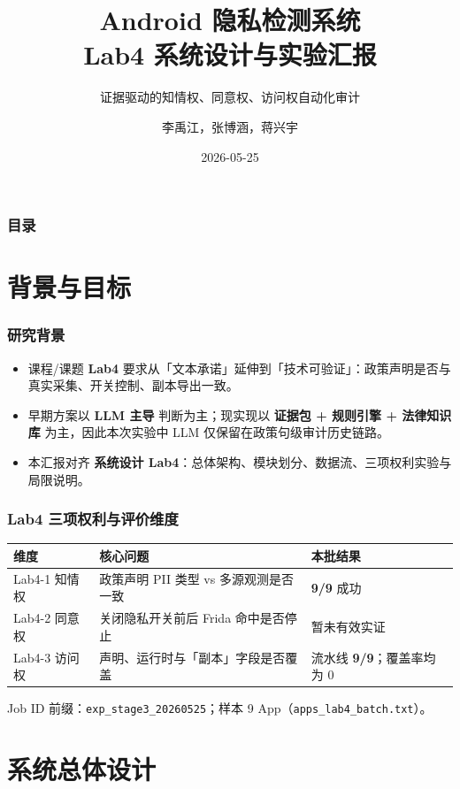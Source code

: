 \documentclass[AutoFakeBold,AutoFakeSlant]{beamer}
\author{李禹江，张博涵，蒋兴宇}
\title{Android 隐私检测系统\\Lab4 系统设计与实验汇报}
\subtitle{证据驱动的知情权、同意权、访问权自动化审计}
\institute{我的刀盾队}
\date{2026-05-25}
\begin{document}
\kaishu

\begin{frame}
    \titlepage
\end{frame}

\begin{frame}
    \frametitle{目录}
    \tableofcontents
\end{frame}

\section{背景与目标}

\begin{frame}
    \frametitle{研究背景}
    \small
    \begin{itemize}
        \item 课程/课题 \textbf{Lab4} 要求从「文本承诺」延伸到「技术可验证」：政策声明是否与真实采集、开关控制、副本导出一致。
        \item 早期方案以 \textbf{LLM 主导} 判断为主；现实现以 \textbf{证据包 + 规则引擎 + 法律知识库} 为主，因此本次实验中 LLM 仅保留在政策句级审计历史链路。
        \item 本汇报对齐 \textbf{系统设计 Lab4}：总体架构、模块划分、数据流、三项权利实验与局限说明。
    \end{itemize}
\end{frame}

\begin{frame}
    \frametitle{Lab4 三项权利与评价维度}
    \small
    \begin{tabularx}{\textwidth}{|l|X|l|}
        \hline
        \textbf{维度} & \textbf{核心问题} & \textbf{本批结果} \\
        \hline
        Lab4-1 知情权 & 政策声明 PII 类型 vs 多源观测是否一致 & \textbf{9/9} 成功 \\
        \hline
        Lab4-2 同意权 & 关闭隐私开关前后 Frida 命中是否停止 & 暂未有效实证 \\
        \hline
        Lab4-3 访问权 & 声明、运行时与「副本」字段是否覆盖 & 流水线 \textbf{9/9}；覆盖率均为 0 \\
        \hline
    \end{tabularx}
    \vspace{0.4em}
    \scriptsize
    Job ID 前缀：\texttt{exp\_stage3\_20260525}；样本 9 App（\texttt{apps\_lab4\_batch.txt}）。
\end{frame}

\section{系统总体设计}
\end{document}
